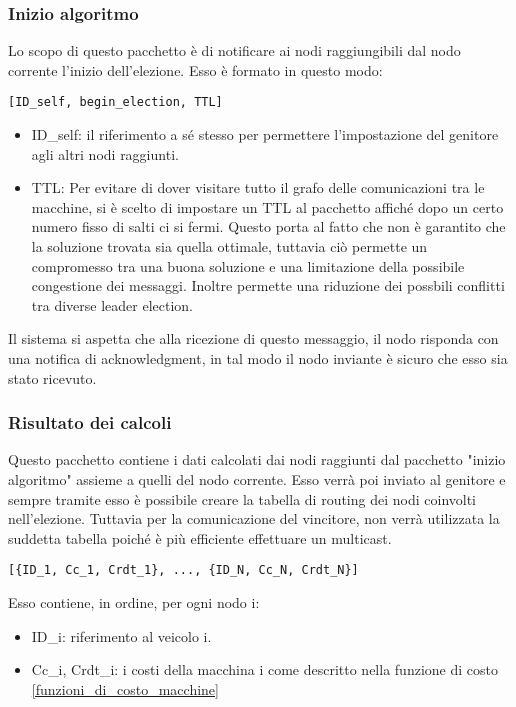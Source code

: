 \subsubsection{Inizio algoritmo}
Lo scopo di questo pacchetto è di notificare ai nodi raggiungibili dal nodo corrente l'inizio dell'elezione. Esso è formato in questo modo:

\begin{lstlisting}
[ID_self, begin_election, TTL]
\end{lstlisting}

\begin{itemize}
	\item ID\_self: il riferimento a sé stesso per permettere l'impostazione del genitore agli altri nodi raggiunti.
	\item TTL: Per evitare di dover visitare tutto il grafo delle comunicazioni tra le macchine, si è scelto di impostare un TTL al pacchetto affiché dopo un certo numero fisso di salti ci si fermi. Questo porta al fatto che non è garantito che la soluzione trovata sia quella ottimale, tuttavia ciò permette un compromesso tra una buona soluzione e una limitazione della possibile congestione dei messaggi. Inoltre permette una riduzione dei possbili conflitti tra diverse leader election.
\end{itemize}

Il sistema si aspetta che alla ricezione di questo messaggio, il nodo risponda con una notifica di acknowledgment, in tal modo il nodo inviante è sicuro che esso sia stato ricevuto.

\subsubsection{Risultato dei calcoli} \label{pacchetto_calcolato}
Questo pacchetto contiene i dati calcolati dai nodi raggiunti dal pacchetto "inizio algoritmo" assieme a quelli del nodo corrente. Esso verrà poi inviato al genitore e sempre tramite esso è possibile creare la tabella di routing dei nodi coinvolti nell'elezione. Tuttavia per la comunicazione del vincitore, non verrà utilizzata la suddetta tabella poiché è più efficiente effettuare un multicast.

\begin{lstlisting} 
[{ID_1, Cc_1, Crdt_1}, ..., {ID_N, Cc_N, Crdt_N}]
\end{lstlisting}

Esso contiene, in ordine, per ogni nodo i: 
\begin{itemize}
	\item ID\_i: riferimento al veicolo i.
	\item Cc\_i, Crdt\_i: i costi della macchina i come descritto nella funzione di costo \ref{funzioni_di_costo_macchine}
\end{itemize}

